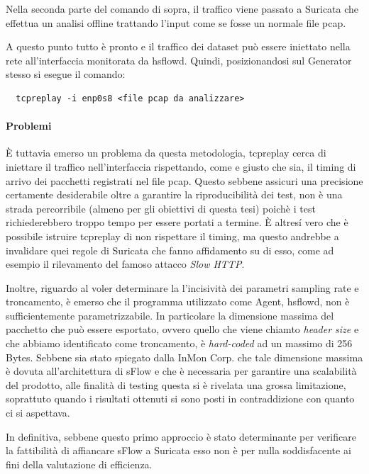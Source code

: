 \documentclass[12pt,a4paper,openright,twoside]{report}
\begin{document}
Nella seconda parte del comando di sopra, il traffico viene passato a Suricata
che effettua un analisi offline trattando l'input come se fosse un normale file pcap.

A questo punto tutto \`e pronto e il traffico dei dataset pu\`o essere iniettato
nella rete all'interfaccia monitorata da hsflowd. Quindi, posizionandosi sul Generator stesso si esegue il
comando:
\begin{verbatim}
  tcpreplay -i enp0s8 <file pcap da analizzare>
\end{verbatim}

\paragraph{Problemi}

\`E tuttavia emerso un problema da questa metodologia, tcpreplay cerca di iniettare
il traffico nell'interfaccia rispettando, come e giusto che sia, il timing di arrivo
dei pacchetti registrati nel file pcap. Questo sebbene assicuri una precisione certamente
desiderabile oltre a garantire la riproducibilit\`a dei test, non \`e una strada percorribile
(almeno per gli obiettivi di questa tesi) poich\`e i test richiederebbero troppo tempo per
essere portati a termine.
\`E altres\'i vero che \`e possibile istruire tcpreplay di non rispettare il timing,
ma questo andrebbe a invalidare quei regole di Suricata che fanno affidamento su di esso,
come ad esempio il rilevamento del famoso attacco {\it Slow HTTP}.

Inoltre, riguardo al voler determinare la l'incisivit\`a dei parametri sampling rate e
troncamento, \`e emerso che il programma utilizzato come Agent, hsflowd, non \`e sufficientemente
parametrizzabile.
In particolare la dimensione massima del
pacchetto che pu\`o essere esportato, ovvero quello che viene chiamto {\it header size} e che abbiamo
identificato come troncamento, \`e {\it hard-coded} ad un massimo di 256 Bytes.
Sebbene sia stato spiegato dalla InMon Corp. che tale dimensione massima \`e dovuta all'architettura
di sFlow e che \`e necessaria per garantire una scalabilit\`a del prodotto, alle
finalit\`a di testing questa si \`e rivelata una grossa limitazione, soprattuto quando i
risultati ottenuti si sono posti in contraddizione con quanto ci si aspettava.

In definitiva, sebbene questo primo approccio \`e stato determinante per verificare
la fattibilit\`a di affiancare sFlow a Suricata esso non \`e per nulla soddisfacente
ai fini della valutazione di efficienza.
\end{document}
